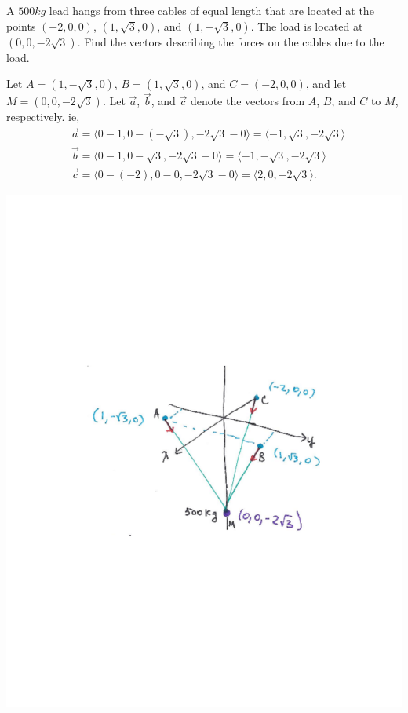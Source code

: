 \documentclass[]{ximera}
\begin{document}
\begin{problem}
A $500kg$ lead hangs from three cables of equal length that are located at the points $(-2,0,0)$, $(1, \sqrt{3},0)$, and $(1, -\sqrt{3},0)$.  
The load is located at $(0,0,-2 \sqrt{3})$.  
Find the vectors describing the forces on the cables due to the load.
	\begin{freeResponse}
	Let $A = (1,-\sqrt{3},0)$, $B = (1, \sqrt{3},0)$, and $C = (-2,0,0)$, and let $M = (0,0, -2\sqrt{3})$.  
	Let $\vec{a}$, $\vec{b}$, and $\vec{c}$ denote the vectors from $A$, $B$, and $C$ to $M$, respectively.  
	ie, 
		\begin{align*}
		&\vec{a} = \langle 0-1, 0 - (-\sqrt{3}), -2 \sqrt{3}-0 \rangle = \langle -1, \sqrt{3}, -2 \sqrt{3} \rangle  \\
		&\vec{b} = \langle 0-1, 0 - \sqrt{3}, -2 \sqrt{3} - 0 \rangle = \langle -1, -\sqrt{3}, -2 \sqrt{3} \rangle  \\
		&\vec{c} = \langle 0- (-2), 0 - 0, -2 \sqrt{3} - 0 \rangle = \langle 2, 0, -2 \sqrt{3} \rangle .
		\end{align*}
		
		\begin{image}
		\includegraphics[trim= 230 270 170 270, scale=0.8]{Figure12-2-1.pdf}
		\end{image}
		

\end{freeResponse}
\end{problem}
\end{document}
